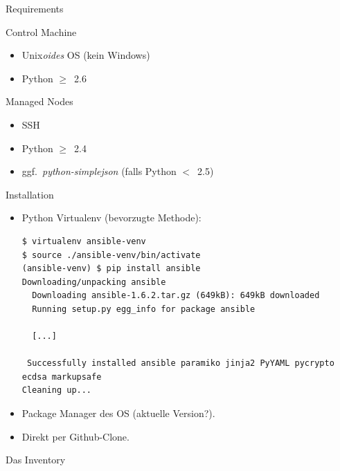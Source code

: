 \begin{frame}{Requirements}

  \begin{block}{Control Machine}
    \begin{itemize}
      \item Unix\emph{oides} OS (kein Windows)
      \item Python $\ge$~2.6
    \end{itemize}
  \end{block}

  \begin{block}{Managed Nodes}
    \begin{itemize}
      \item SSH
      \item Python $\ge$~2.4
      \item ggf.~\emph{python-simplejson} (falls Python $<$~2.5)
    \end{itemize}
  \end{block}
\end{frame}


\begin{frame}[fragile]{Installation}
  \begin{itemize}
    \item Python Virtualenv (bevorzugte Methode):

    \begin{lstlisting}
$ virtualenv ansible-venv
$ source ./ansible-venv/bin/activate
(ansible-venv) $ pip install ansible
Downloading/unpacking ansible
  Downloading ansible-1.6.2.tar.gz (649kB): 649kB downloaded
  Running setup.py egg_info for package ansible

  [...]

 Successfully installed ansible paramiko jinja2 PyYAML pycrypto ecdsa markupsafe
Cleaning up...
    \end{lstlisting}

    \item Package Manager des OS (aktuelle Version?).

    \item Direkt per Github-Clone.
  \end{itemize}
\end{frame}


\begin{frame}[fragile]{Das Inventory}
  
\end{frame}


